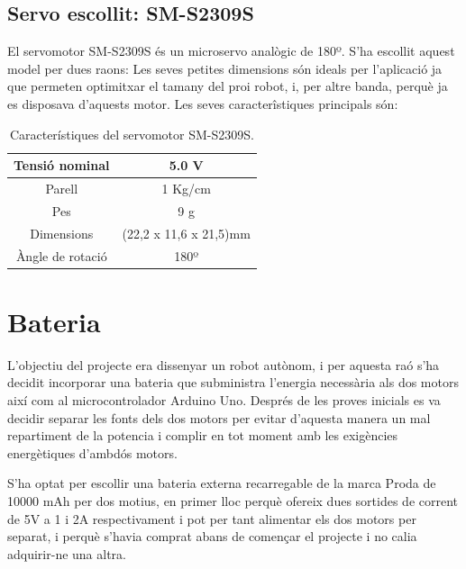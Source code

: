 \subsection{Servo escollit: SM-S2309S}

El servomotor SM-S2309S és un microservo analògic de 180º. S'ha escollit aquest model per dues raons: Les seves petites dimensions són ideals per l'aplicació ja que permeten optimitxar el tamany del proi robot, i, per altre banda, perquè ja es disposava d'aquests motor. Les seves caracterîstiques principals són:  

\begin{table}[htbp]
	\begin{center}
		\begin{tabular}{|c|c|}
			\hline
			
			Tensió nominal & 5.0 V  \\ \hline
			Parell & 1 Kg/cm  \\ \hline
			Pes & 9 g  \\ \hline
			Dimensions & (22,2 x 11,6 x 21,5)mm  \\ \hline
			Àngle de rotació & 180º  \\ \hline
		\end{tabular}
		\caption{Característiques del servomotor SM-S2309S.}
		\label{tabla:servo}
	\end{center}
\end{table}
\section{Bateria}

L’objectiu del projecte era dissenyar un robot autònom, i per aquesta raó s’ha decidit incorporar una bateria que subministra l’energia necessària als dos motors així com al microcontrolador Arduino Uno. Després de les proves inicials es va decidir separar les fonts dels dos motors per evitar d’aquesta manera un mal repartiment de la potencia i complir en tot moment amb les exigències energètiques d’ambdós motors. 

S’ha optat per escollir una bateria externa recarregable de la marca Proda de 10000 mAh per dos motius, en primer lloc perquè ofereix dues sortides de corrent de 5V a 1 i 2A respectivament i pot per tant alimentar els dos motors per separat, i perquè s’havia comprat abans de començar el projecte i no calia adquirir-ne una altra. 

